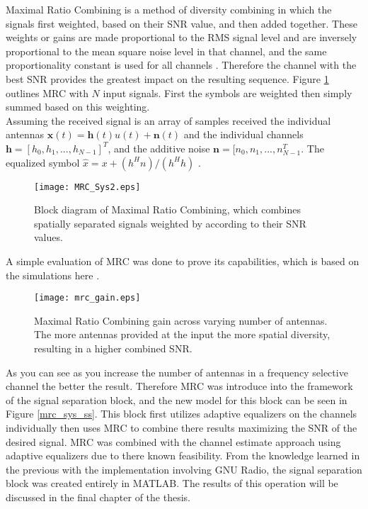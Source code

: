 Maximal Ratio Combining is a method of diversity combining in which the signals first weighted, based on their SNR value, and then added together.  These weights or gains are made proportional to the RMS signal level and are inversely proportional to the mean square noise level in that channel, and the same proportionality constant is used for all channels \cite{fs1037c}.  Therefore the channel with the best SNR provides the greatest impact on the resulting sequence. Figure \ref{fig:MRC} outlines MRC with \(N\) input signals.  First the symbols are weighted then simply summed based on this weighting.\\

Assuming the received signal is an array of samples received the individual antennas \(\boldsymbol{x}(t)=\boldsymbol{h}(t)u(t)+\boldsymbol{n}(t)\) and the individual channels \(\boldsymbol{h}=[h_{0},h_{1},...,h_{N-1}]^{T}\), and the additive noise \(\boldsymbol{n}=[n_{0},n_{1},...,n_{N-1}^{T}\).  The equalized symbol \(\hat{x}=x+(h^{H}n)/(h^{H}h) \) \cite{diversity}.

\begin{figure}[!ht]\label{fig:MRC}
\centering
\texttt{[image: MRC\_Sys2.eps]}
\caption{Block diagram of Maximal Ratio Combining, which combines spatially separated signals weighted by according to their SNR values.}
\end{figure}


A simple evaluation of MRC was done to prove its capabilities, which is based on the simulations here \cite{mrc_m}.

\begin{figure}[!ht]\label{mrc_sys}
\centering
\texttt{[image: mrc\_gain.eps]}
\caption{Maximal Ratio Combining gain across varying number of antennas.  The more antennas provided at the input the more spatial diversity, resulting in a higher combined SNR.}
\end{figure}

As you can see as you increase the number of antennas in a frequency selective channel the better the result.  Therefore MRC was introduce into the framework of the signal separation block, and the new model for this block can be seen in Figure \ref{mrc_sys_ss}.  This block first utilizes adaptive equalizers on the channels individually then uses MRC to combine there results maximizing the SNR of the desired signal.  MRC was combined with the channel estimate approach using adaptive equalizers due to there known feasibility.  From the knowledge learned in the previous with the implementation involving GNU Radio, the signal separation block was created entirely in MATLAB.  The results of this operation will be discussed in the final chapter of the thesis.\\

